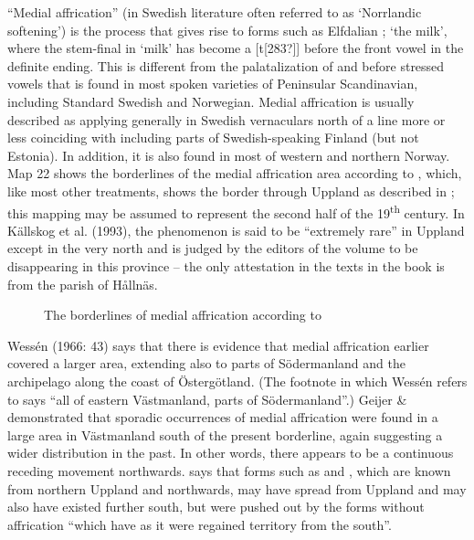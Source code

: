 “Medial affrication” (in Swedish literature often referred to as  ‘Norrlandic softening’) is the process that gives rise to forms such as Elfdalian ; ‘the milk’, where the stem-final  in  ‘milk’ has become a [t[283?]] before the front vowel in the definite ending. This is different from the palatalization of  and  before stressed vowels that is found in most spoken varieties of Peninsular Scandinavian, including Standard Swedish and Norwegian. Medial affrication is usually described as applying generally in Swedish vernaculars north of a line more or less coinciding with  including parts of Swedish-speaking Finland (but not Estonia). In addition, it is also found in most of western and northern Norway. Map 22 shows the borderlines of the medial affrication area according to \citet{Haugen1970}, which, like most other treatments, shows the border through Uppland as described in \citet{Kruuse1908}; this mapping may be assumed to represent the second half of the 19\textsuperscript{th} century. In Källskog et al. (1993), the phenomenon is said to be “extremely rare” in Uppland except in the very north and is judged by the editors of the volume to be disappearing in this province – the only attestation in the texts in the book is from the parish of Hållnäs. 



\begin{figure}[h]
 
\caption{The borderlines of medial affrication according to \citet{Haugen1970}}
\label{map:6:22}

 
\end{figure}


Wessén (1966: 43) says that there is evidence that medial affrication earlier covered a larger area, extending also to parts of Södermanland and the archipelago along the coast of Östergötland. (The footnote in \citet[36]{Hesselman1905} which Wessén refers to says “all of eastern Västmanland, parts of Södermanland”.) Geijer \& \citet{Holmkvist1930} demonstrated that sporadic occurrences of medial affrication were found in a large area in Västmanland south of the present borderline, again suggesting a wider distribution in the past. In other words, there appears to be a continuous receding movement northwards. \citet[80]{Reinhammar2005} says that forms such as  and , which are known from northern Uppland and northwards, may have spread from Uppland and may also have existed further south, but were pushed out by the forms without affrication “which have as it were regained territory from the south”.




